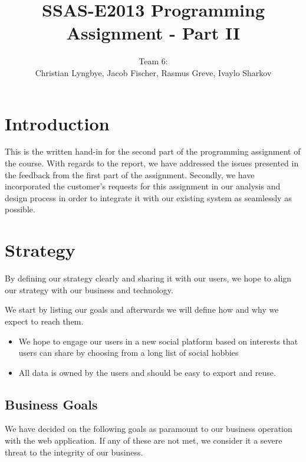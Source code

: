 \documentclass[a4paper]{article}
\title{SSAS-E2013 Programming Assignment - Part II}
\author{Team 6:\\Christian Lyngbye, Jacob Fischer, Rasmus Greve, Ivaylo Sharkov}
\begin{document}
\maketitle

\section{Introduction}
This is the written hand-in for the second part of the programming assignment of the course. With regards to the report, we have addressed the issues presented in the feedback from the first part of the assignment. Secondly, we have incorporated the customer's requests for this assignment in our analysis and design process in order to integrate it with our existing system as seamlessly as possible.


\section{Strategy}
By defining our strategy clearly and sharing it with our users, we hope to align our strategy with our business and technology.

We start by listing our goals and afterwards we will define how and why we expect to reach them.

\begin{itemize}
\item
We hope to engage our users in a new social platform based on interests that users can share by choosing from a long list of social hobbies
\item
All data is owned by the users and should be easy to export and reuse.
\end{itemize}



\subsection{Business Goals}


We have decided on the following goals as paramount to our business operation with the web application. If any of these are not met, we consider it a severe threat to the integrity of our business.
\end{document}
